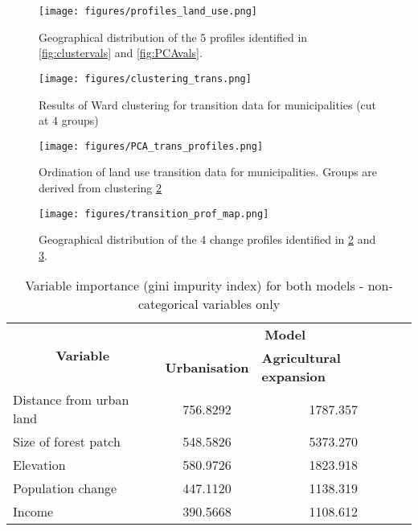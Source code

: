 \begin{figure}[h!]
  \centering
    \texttt{[image: figures/profiles\_land\_use.png]}
  \caption{Geographical distribution of the 5 profiles identified in \ref{fig:clustervals} and \ref{fig:PCAvals}.}
  \label{fig:mapvals}
\end{figure}

\begin{figure}[h!]
  \centering
    \texttt{[image: figures/clustering\_trans.png]}
  \caption{Results of Ward clustering for transition data for municipalities (cut at 4 groups)}
  \label{fig:clustertrans}
\end{figure}

\begin{figure}[h!]
  \centering
    \texttt{[image: figures/PCA\_trans\_profiles.png]}
  \caption{Ordination of land use transition data for municipalities. Groups are derived from clustering \ref{fig:clustertrans}}
  \label{fig:PCAtrans}
\end{figure}

\begin{figure}[h!]
  \centering
    \texttt{[image: figures/transition\_prof\_map.png]}
  \caption{Geographical distribution of the 4 change profiles identified in \ref{fig:clustertrans} and \ref{fig:PCAtrans}.}
  \label{fig:maptrans}
\end{figure}

\clearpage


\begin{table}[h!]
\centering
\caption{Variable importance (gini impurity index) for both models - non-categorical variables only}
\label{tab:varimp}
\begin{tabular}{lcc}
\hline
\multicolumn{1}{c}{\multirow{2}{*}{\textbf{Variable}}} & \multicolumn{2}{c}{\textbf{Model}} \\ \cline{2-3} 
\multicolumn{1}{c}{} & \multicolumn{1}{l}{\textbf{Urbanisation}} & \multicolumn{1}{l}{\textbf{Agricultural expansion}} \\ \hline
Distance from urban land & 756.8292 & 1787.357 \\
Size of forest patch & 548.5826 & 5373.270 \\
Elevation & 580.9726 & 1823.918 \\
Population change & 447.1120 & 1138.319 \\
Income & 390.5668 & 1108.612 \\ 
\hline
\end{tabular}
\end{table}

